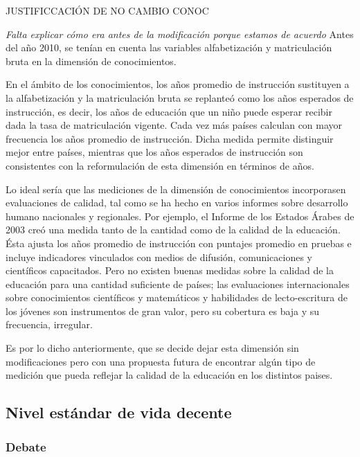 \documentclass[
  10pt,
]{article}
\begin{document}
JUSTIFICCACIÓN DE NO CAMBIO CONOC

\emph{Falta explicar cómo era antes de la modificación porque estamos de
acuerdo} Antes del año 2010, se tenían en cuenta las variables
alfabetización y matriculación bruta en la dimensión de conocimientos.

En el ámbito de los conocimientos, los años promedio de instrucción
sustituyen a la alfabetización y la matriculación bruta se replanteó
como los años esperados de instrucción, es decir, los años de educación
que un niño puede esperar recibir dada la tasa de matriculación vigente.
Cada vez más países calculan con mayor frecuencia los años promedio de
instrucción. Dicha medida permite distinguir mejor entre países,
mientras que los años esperados de instrucción son consistentes con la
reformulación de esta dimensión en términos de años.

Lo ideal sería que las mediciones de la dimensión de conocimientos
incorporasen evaluaciones de calidad, tal como se ha hecho en varios
informes sobre desarrollo humano nacionales y regionales. Por ejemplo,
el Informe de los Estados Árabes de 2003 creó una medida tanto de la
cantidad como de la calidad de la educación. Ésta ajusta los años
promedio de instrucción con puntajes promedio en pruebas e incluye
indicadores vinculados con medios de difusión, comunicaciones y
científicos capacitados. Pero no existen buenas medidas sobre la calidad
de la educación para una cantidad suficiente de países; las evaluaciones
internacionales sobre conocimientos científicos y matemáticos y
habilidades de lecto-escritura de los jóvenes son instrumentos de gran
valor, pero su cobertura es baja y su frecuencia, irregular.

Es por lo dicho anteriormente, que se decide dejar esta dimensión sin
modificaciones pero con una propuesta futura de encontrar algún tipo de
medición que pueda reflejar la calidad de la educación en los distintos
paises.

\hypertarget{nivel-estuxe1ndar-de-vida-decente-1}{%
\subsection{Nivel estándar de vida
decente}\label{nivel-estuxe1ndar-de-vida-decente-1}}

\hypertarget{debate-1}{%
\subsubsection{Debate}\label{debate-1}}
\end{document}
